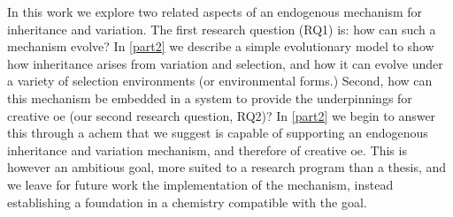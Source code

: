 In this work we explore two related aspects of an endogenous mechanism for inheritance and variation. The first research question (RQ1) is: how can such a mechanism evolve? In \cref{part2} we describe a simple evolutionary model to show how inheritance arises from variation and selection, and how it can evolve under a variety of selection environments (or environmental forms.) Second, how can this mechanism be embedded in a system to provide the underpinnings for creative \gls{oe} (our second research question, RQ2)? In \cref{part2} we begin to answer this through a \gls{achem} that we suggest is capable of supporting an endogenous inheritance and variation mechanism, and therefore of creative \gls{oe}. This is however an ambitious goal, more suited to a research program than a thesis, and we leave for future work the implementation of the mechanism, instead establishing a foundation in a chemistry compatible with the goal.

